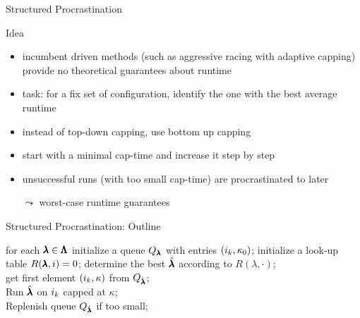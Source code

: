 \begin{frame}[c,fragile]{Structured Procrastination }

\begin{block}{Idea}
	\begin{itemize}
		\item incumbent driven methods (such as aggressive racing with adaptive capping) provide no theoretical guarantees about runtime
		\pause
		\item task: for a fix set of configuration, identify the one with the best average runtime
		
		\item instead of top-down capping, use bottom up capping
		\pause
		\item start with a minimal cap-time and increase it step by step
		\pause
		\item unsuccessful runs (with too small cap-time) are procrastinated to later
		\item[$\leadsto$] worst-case runtime guarantees
	\end{itemize}
\end{block}

\end{frame}

\begin{frame}[c,fragile]{Structured Procrastination: Outline }


\LinesNotNumbered
\begin{algorithm}[H]
\begin{footnotesize}
	\BlankLine
	for each $\pmb{\lambda} \in \pmb{\Lambda}$ initialize a queue $Q_{\pmb{\lambda}}$ with entries $(i_k, \kappa_0)$; 
	initialize a look-up table $R(\pmb{\lambda}, i) = 0$; 
	\pause
	 {
		\pause
		determine the best $\hat{\pmb{\lambda}}$ according to $R(\lambda, \cdot)$;\\
		\pause
		get first element $(i_k, \kappa)$ from $Q_{\hat{\pmb{\lambda}}}$;\\
		\pause
		Run $\hat{\pmb{\lambda}}$ on $i_k$ capped at $\kappa$;\\
		\pause
		\pause
		Replenish queue $Q_{\hat{\pmb{\lambda}}}$ if too small;	
	}
	\pause
	\caption{Structured Procrastination}
\end{footnotesize}
\end{algorithm}
\end{frame}

